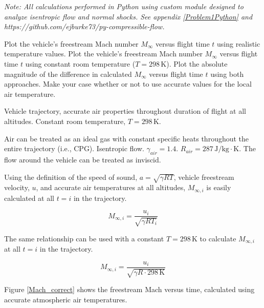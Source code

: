 \documentclass[../main.tex]{subfiles}
\begin{document}

\textit{Note: All calculations performed in Python using custom module designed to analyze isentropic flow and normal shocks. See appendix \ref{Problem1Python} and https://github.com/ejburke73/py-compressible-flow.}


Plot the vehicle's freestream Mach number \(M_\infty\) versus flight time \(t\) using realistic temperature values.
Plot the vehicle's freestream Mach number \(M_\infty\) versus flight time \(t\) using constant room temperature (\(T=298\,\unit{\kelvin}\)).
Plot the absolute magnitude of the difference in calculated \(M_\infty\) versus flight time \(t\) using both approaches.
Make your case whether or not to use accurate values for the local air temperature.

\givens{}
Vehicle trajectory, accurate air properties throughout duration of flight at all altitudes.
Constant room temperature, \(T=298\,\unit{\kelvin}\).

\assumptions{}
Air can be treated as an ideal gas with constant specific heats throughout the entire trajectory (i.e., CPG).
Isentropic flow.
\(\gamma_{air} = 1.4\). 
\(R_{air} = 287 \, \unit{\joule/\kilogram\cdot\kelvin}\). 
The flow around the vehicle can be treated as inviscid.

\solution{}
Using the definition of the speed of sound, \(a=\sqrt{\gamma R T}\), vehicle freestream velocity, \(u\), and accurate air temperatures at all altitudes, \(M_{\infty,i}\) is easily calculated at all \(t=i\) in the trajectory.

\[
    M_{\infty,i} = \frac{u_i}{\sqrt{\gamma R T_i}}  
\]

The same relationship can be used with a constant \(T=298\,\unit{\kelvin}\) to calculate \(M_{\infty,i}\) at all \(t=i\) in the trajectory.

\[
    M_{\infty,i} = \frac{u_i}{\sqrt{\gamma R \cdot 298 \, \unit{\kelvin}}}  
\]

Figure \ref{Mach_correct} shows the freestream Mach versus time, calculated using accurate atmospheric air temperatures.
\end{document}
